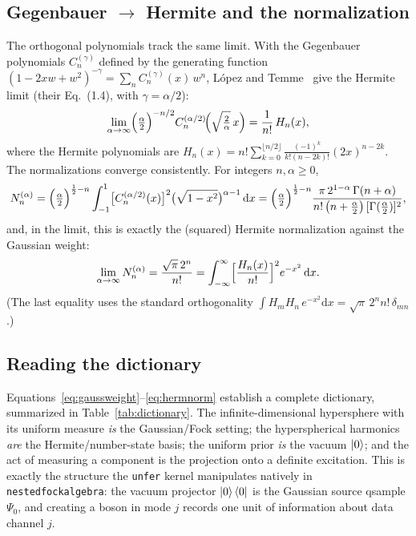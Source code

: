 \documentclass[11pt, a4paper]{article}
\begin{document}
\subsection{Gegenbauer \texorpdfstring{$\to$}{to} Hermite and the normalization}

The orthogonal polynomials track the same limit. With the Gegenbauer
polynomials $C_n^{(\gamma)}$ defined by the generating function
$(1-2xw+w^2)^{-\gamma}=\sum_n C_n^{(\gamma)}(x)\,w^n$, L\'opez and
Temme~\cite{LopezTemme1999} give the Hermite limit (their Eq.~(1.4), with
$\gamma=\alpha/2$):
\begin{equation}
  \lim_{\alpha\to\infty}\Bigl(\tfrac{\alpha}{2}\Bigr)^{-n/2}
  C_n^{(\alpha/2)}\!\Bigl(\sqrt{\tfrac{2}{\alpha}}\,x\Bigr)
  =\frac{1}{n!}\,H_n(x),
  \label{eq:gegtoherm}
\end{equation}
where the Hermite polynomials are
$H_n(x)=n!\sum_{k=0}^{\lfloor n/2\rfloor}\frac{(-1)^k}{k!(n-2k)!}(2x)^{n-2k}$.
The normalizations converge consistently. For integers $n,\alpha\ge0$,
\begin{equation}
  N^{(\alpha)}_n
  =\Bigl(\tfrac{\alpha}{2}\Bigr)^{\frac12-n}
  \int_{-1}^{1}\bigl[C_n^{(\alpha/2)}(x)\bigr]^2
  \bigl(\sqrt{1-x^2}\bigr)^{\alpha-1}\,\mathrm{d}x
  =\Bigl(\tfrac{\alpha}{2}\Bigr)^{\frac12-n}
  \frac{\pi\,2^{1-\alpha}\,\Gamma(n+\alpha)}
       {n!\,\bigl(n+\tfrac{\alpha}{2}\bigr)\,[\Gamma(\tfrac{\alpha}{2})]^2},
  \label{eq:gegnorm}
\end{equation}
and, in the limit, this is exactly the (squared) Hermite normalization against
the Gaussian weight:
\begin{equation}
  \lim_{\alpha\to\infty}N^{(\alpha)}_n
  =\frac{\sqrt{\pi}\,2^n}{n!}
  =\int_{-\infty}^{\infty}\Bigl[\frac{H_n(x)}{n!}\Bigr]^2 e^{-x^2}\,\mathrm{d}x .
  \label{eq:hermnorm}
\end{equation}
(The last equality uses the standard orthogonality
$\int H_m H_n\,e^{-x^2}\mathrm{d}x=\sqrt{\pi}\,2^n n!\,\delta_{mn}$.)

\subsection{Reading the dictionary}

Equations~\eqref{eq:gaussweight}--\eqref{eq:hermnorm} establish a complete
dictionary, summarized in Table~\ref{tab:dictionary}. The infinite-dimensional
hypersphere with its uniform measure \emph{is} the Gaussian/Fock setting; the
hyperspherical harmonics \emph{are} the Hermite/number-state basis; the
uniform prior \emph{is} the vacuum $\ket{0}$; and the act of measuring a
component is the projection onto a definite excitation. This is exactly the
structure the \texttt{unfer} kernel manipulates natively in
\texttt{nested\textunderscore fock\textunderscore algebra}: the vacuum
projector $\ket{0}\bra{0}$ is the Gaussian source qsample $\Psi_0$, and creating
a boson in mode $j$ records one unit of information about data channel $j$.
\end{document}
